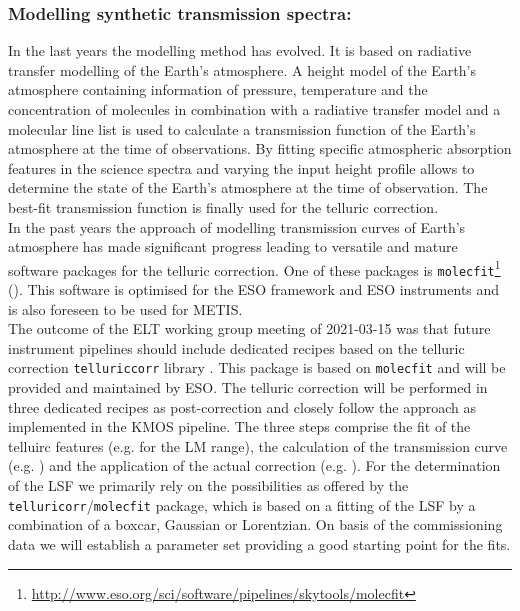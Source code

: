 \subsubsection{Modelling synthetic transmission spectra:}
In the last years the modelling method has evolved. It is based on radiative transfer modelling of the Earth's atmosphere. A height model of the Earth's atmosphere containing information of pressure, temperature and the concentration of molecules in combination with a radiative transfer model and a molecular line list is used to calculate a transmission function of the Earth's atmosphere at the time of observations. By fitting specific atmospheric absorption features in the science spectra and varying the input height profile allows to determine the state of the Earth's atmosphere at the time of observation. The best-fit transmission function is finally used for the telluric correction.\\
In the past years the approach of modelling transmission curves of Earth's atmosphere has made significant progress leading to versatile and mature software packages for the telluric correction. One of these packages is \texttt{molecfit}\footnote{\url{http://www.eso.org/sci/software/pipelines/skytools/molecfit}} (\cite{mf1, mf2, molecfit}). This software is optimised for the ESO framework and ESO instruments and is also foreseen to be used for \ac{METIS}.\\
The outcome of the \ac{ELT} working group meeting of 2021-03-15 was that future instrument pipelines should include dedicated recipes based on the telluric correction \texttt{telluriccorr} library \cite{telluriccorr}. This package is based on \texttt{molecfit} and will be provided and maintained by \ac{ESO}. The telluric correction will be performed in three dedicated recipes as post-correction   and closely follow the approach as implemented in the \ac{KMOS} pipeline. The three steps comprise the fit of the telluirc features (e.g.  for the LM range), the calculation of the transmission curve (e.g. ) and the application of the actual correction (e.g. ). For the determination of the \ac{LSF} we primarily rely on the possibilities as offered by the \texttt{telluricorr}/\texttt{molecfit} package, which is based on a fitting of the \ac{LSF} by a combination of a boxcar, Gaussian or Lorentzian. On basis of the commissioning data we will establish a parameter set providing a good starting point for the fits.\\
